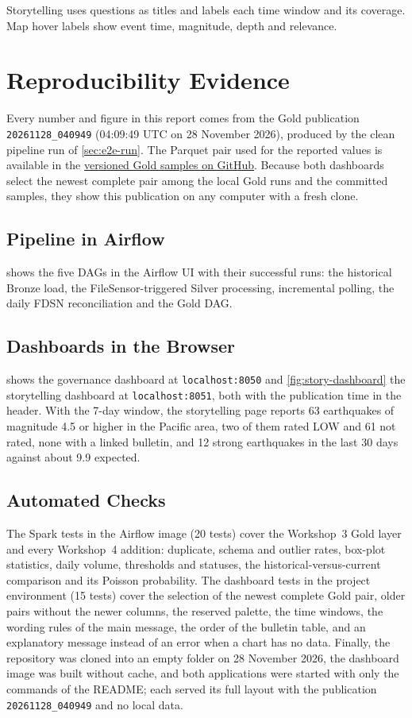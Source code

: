 \documentclass[a4paper,11pt,oneside]{book}
\begin{document}
Storytelling uses questions as titles and labels each time window and its coverage. Map hover labels show event time, magnitude, depth and relevance.

\chapter{Reproducibility Evidence}
\label{ch:evidence}
Every number and figure in this report comes from the Gold publication \texttt{20261128\_040949} (04:09:49 UTC on 28 November 2026), produced by the clean pipeline run of \cref{sec:e2e-run}. The Parquet pair used for the reported values is available in the \href{https://github.com/g8martinezsilva/tsunami-monitoring/tree/2ddcd4b9304bc31b764f940242b26021786fbd2e/datalake_gold/samples}{versioned Gold samples on GitHub}. Because both dashboards select the newest complete pair among the local Gold runs and the committed samples, they show this publication on any computer with a fresh clone.

\section{Pipeline in Airflow}
 shows the five DAGs in the Airflow UI with their successful runs: the historical Bronze load, the FileSensor-triggered Silver processing, incremental polling, the daily FDSN reconciliation and the Gold DAG.

\section{Dashboards in the Browser}
 shows the governance dashboard at \texttt{localhost:8050} and \cref{fig:story-dashboard} the storytelling dashboard at \texttt{localhost:8051}, both with the publication time in the header. With the 7-day window, the storytelling page reports 63 earthquakes of magnitude 4.5 or higher in the Pacific area, two of them rated LOW and 61 not rated, none with a linked bulletin, and 12 strong earthquakes in the last 30 days against about 9.9 expected.

\section{Automated Checks}
The Spark tests in the Airflow image (20 tests) cover the Workshop~3 Gold layer and every Workshop~4 addition: duplicate, schema and outlier rates, box-plot statistics, daily volume, thresholds and statuses, the historical-versus-current comparison and its Poisson probability. The dashboard tests in the project environment (15 tests) cover the selection of the newest complete Gold pair, older pairs without the newer columns, the reserved palette, the time windows, the wording rules of the main message, the order of the bulletin table, and an explanatory message instead of an error when a chart has no data. Finally, the repository was cloned into an empty folder on 28 November 2026, the dashboard image was built without cache, and both applications were started with only the commands of the README; each served its full layout with the publication \texttt{20261128\_040949} and no local data.
\end{document}
